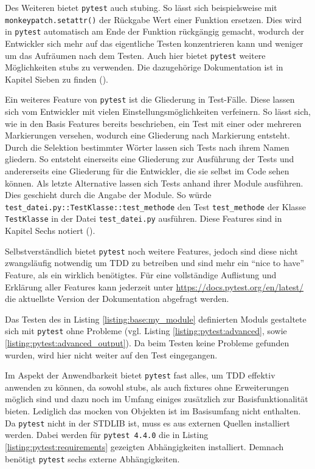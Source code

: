 Des Weiteren bietet \lstinline{pytest} auch \gls{stub}ing. So lässt sich
beispielsweise mit \lstinline{monkeypatch.setattr()} der Rückgabe Wert einer
Funktion ersetzen. Dies wird in \lstinline{pytest} automatisch am Ende der
Funktion rückgängig gemacht, wodurch der Entwickler sich mehr auf das
eigentliche Testen konzentrieren kann und weniger um das Aufräumen nach dem
Testen. Auch hier bietet \lstinline{pytest} weitere Möglichkeiten \Glspl{stub}
zu verwenden. Die dazugehörige Dokumentation ist in Kapitel Sieben zu finden
(\cite{docs.pytest.org:4.4}).
\newline

Ein weiteres Feature von \lstinline{pytest} ist die Gliederung in Test-Fälle.
Diese lassen sich vom Entwickler mit vielen Einstellungsmöglichkeiten
verfeinern. So lässt sich, wie in den Basis Features bereits beschrieben, ein
Test mit einer oder mehreren Markierungen versehen, wodurch eine Gliederung nach
Markierung entsteht. Durch die Selektion bestimmter Wörter lassen sich
Tests nach ihrem Namen gliedern. So entsteht einerseits eine Gliederung zur
Ausführung der Tests und andererseits eine Gliederung für die Entwickler, die
sie selbst im Code sehen können. Als letzte Alternative lassen sich Tests anhand
ihrer Module ausführen. Dies geschieht durch die Angabe der Module. So würde
\lstinline{test_datei.py::TestKlasse::test_methode} den Test
\lstinline{test_methode} der Klasse \lstinline{TestKlasse} in der Datei
\lstinline{test_datei.py} ausführen. Diese Features sind in Kapitel Sechs
notiert (\cite{docs.pytest.org:4.4}).
\newline

Selbstverständlich bietet \lstinline{pytest} noch weitere Features, jedoch sind
diese nicht zwangsläufig notwendig um TDD zu betreiben und sind mehr ein "`nice
to have"' Feature, als ein wirklich benötigtes. Für eine vollständige
Auflistung und Erklärung aller Features kann jederzeit unter
\url{https://docs.pytest.org/en/latest/} die aktuellste Version der
Dokumentation abgefragt werden.
\newline

Das Testen des in Listing \ref{listing:base:my_module} definierten Moduls
gestaltete sich mit \lstinline{pytest} ohne Probleme (vgl. Listing
\ref{listing:pytest:advanced}, sowie \ref{listing:pytest:advanced_output}). Da
beim Testen keine Probleme gefunden wurden,  wird hier nicht weiter auf den
Test eingegangen.

Im Aspekt der Anwendbarkeit bietet \lstinline{pytest} fast alles, um TDD 
effektiv anwenden zu können, da sowohl \Glspl{stub}, als auch \Glspl{fixture} 
ohne Erweiterungen möglich sind und dazu noch im Umfang einiges zusätzlich zur
Basisfunktionalität bieten. Lediglich das \gls{mock}en von Objekten ist im 
Basisumfang nicht enthalten. Da \lstinline{pytest} nicht in der STDLIB ist, muss
es aus externen Quellen installiert werden. Dabei werden für
\lstinline{pytest 4.4.0} die in Listing \ref{listing:pytest:requirements}
gezeigten Abhängigkeiten installiert. Demnach benötigt \lstinline{pytest} sechs
externe Abhängigkeiten.

